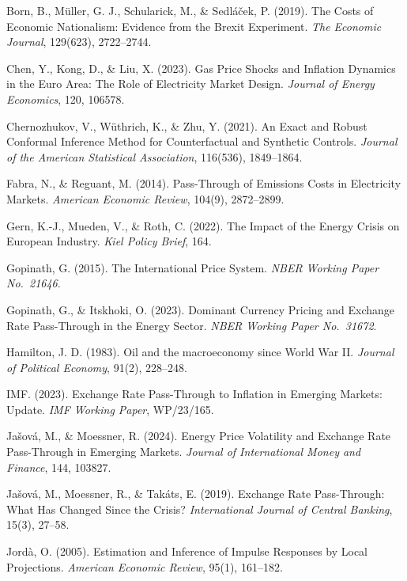 \documentclass[12pt, a4paper]{article}
\begin{document}
\hangindent=0.5cm Born, B., M\"{u}ller, G. J., Schularick, M., \& Sedl\'{a}\v{c}ek, P. (2019). The Costs of Economic Nationalism: Evidence from the Brexit Experiment. \textit{The Economic Journal}, 129(623), 2722--2744.

\hangindent=0.5cm Chen, Y., Kong, D., \& Liu, X. (2023). Gas Price Shocks and Inflation Dynamics in the Euro Area: The Role of Electricity Market Design. \textit{Journal of Energy Economics}, 120, 106578.

\hangindent=0.5cm Chernozhukov, V., W\"{u}thrich, K., \& Zhu, Y. (2021). An Exact and Robust Conformal Inference Method for Counterfactual and Synthetic Controls. \textit{Journal of the American Statistical Association}, 116(536), 1849--1864.

\hangindent=0.5cm Fabra, N., \& Reguant, M. (2014). Pass-Through of Emissions Costs in Electricity Markets. \textit{American Economic Review}, 104(9), 2872--2899.

\hangindent=0.5cm Gern, K.-J., Mueden, V., \& Roth, C. (2022). The Impact of the Energy Crisis on European Industry. \textit{Kiel Policy Brief}, 164.

\hangindent=0.5cm Gopinath, G. (2015). The International Price System. \textit{NBER Working Paper No.\ 21646}.

\hangindent=0.5cm Gopinath, G., \& Itskhoki, O. (2023). Dominant Currency Pricing and Exchange Rate Pass-Through in the Energy Sector. \textit{NBER Working Paper No.\ 31672}.

\hangindent=0.5cm Hamilton, J. D. (1983). Oil and the macroeconomy since World War II. \textit{Journal of Political Economy}, 91(2), 228--248.

\hangindent=0.5cm IMF. (2023). Exchange Rate Pass-Through to Inflation in Emerging Markets: Update. \textit{IMF Working Paper}, WP/23/165.

\hangindent=0.5cm Ja\v{s}ov\'{a}, M., \& Moessner, R. (2024). Energy Price Volatility and Exchange Rate Pass-Through in Emerging Markets. \textit{Journal of International Money and Finance}, 144, 103827.

\hangindent=0.5cm Ja\v{s}ov\'{a}, M., Moessner, R., \& Tak\'{a}ts, E. (2019). Exchange Rate Pass-Through: What Has Changed Since the Crisis? \textit{International Journal of Central Banking}, 15(3), 27--58.

\hangindent=0.5cm Jord\`{a}, O. (2005). Estimation and Inference of Impulse Responses by Local Projections. \textit{American Economic Review}, 95(1), 161--182.
\end{document}
